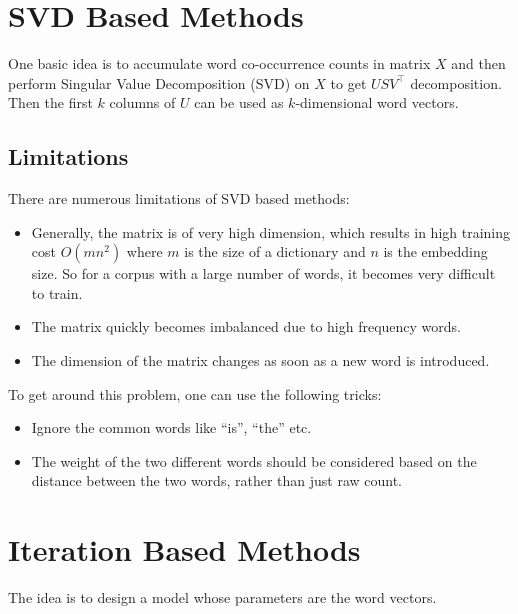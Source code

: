 \documentclass[
]{book}
\providecommand{\tightlist}{%
  \setlength{\itemsep}{0pt}\setlength{\parskip}{0pt}}
\begin{document}
\hypertarget{svd-based-methods}{%
\section{SVD Based Methods}\label{svd-based-methods}}

One basic idea is to accumulate word co-occurrence counts in matrix \(X\) and then perform Singular Value Decomposition (SVD) on \(X\) to get \(USV^\top\) decomposition. Then the first \(k\) columns of \(U\) can be used as \(k\)-dimensional word vectors.

\hypertarget{limitations}{%
\subsection{Limitations}\label{limitations}}

There are numerous limitations of SVD based methods:

\begin{itemize}
\tightlist
\item
  Generally, the matrix is of very high dimension, which results in high training cost \(O(mn^2)\) where \(m\) is the size of a dictionary and \(n\) is the embedding size. So for a corpus with a large number of words, it becomes very difficult to train.
\item
  The matrix quickly becomes imbalanced due to high frequency words.
\item
  The dimension of the matrix changes as soon as a new word is introduced.
\end{itemize}

To get around this problem, one can use the following tricks:

\begin{itemize}
\tightlist
\item
  Ignore the common words like ``is'', ``the'' etc.
\item
  The weight of the two different words should be considered based on the distance between the two words, rather than just raw count.
\end{itemize}

\hypertarget{iteration-based-methods}{%
\section{Iteration Based Methods}\label{iteration-based-methods}}

The idea is to design a model whose parameters are the word vectors.
\end{document}
